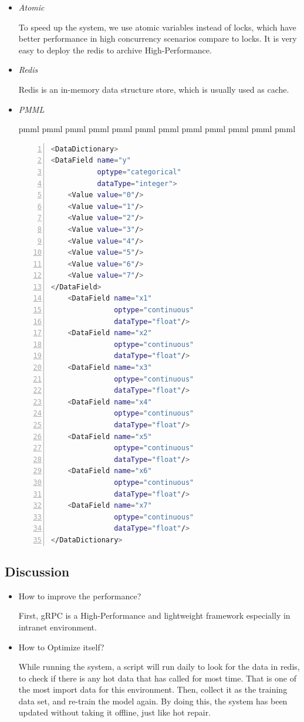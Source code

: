 \documentclass[conference]{IEEEtran}
\begin{document}
\begin{itemize}
	\item \emph{Atomic}

	      To speed up the system, we use atomic variables instead of locks, which have better performance in high concurrency scenarios compare to locks.
	      It is very easy to deploy the redis to archive High-Performance.

	\item \emph{Redis}

	      Redis is an in-memory data structure store, which is usually used as cache.

	\item \emph{PMML}

	pmml pmml pmml pmml pmml pmml pmml pmml pmml pmml pmml pmml
	      \begin{lstlisting}[language={bash},
		basicstyle=\small\menlo,
        numbers=left]
			<DataDictionary>
<DataField name="y" 
		   optype="categorical"
		   dataType="integer">
	<Value value="0"/>
	<Value value="1"/>
	<Value value="2"/>
	<Value value="3"/>
	<Value value="4"/>
	<Value value="5"/>
	<Value value="6"/>
	<Value value="7"/>
</DataField>
	<DataField name="x1"
               optype="continuous" 
               dataType="float"/>
	<DataField name="x2"
               optype="continuous" 
               dataType="float"/>
	<DataField name="x3"
               optype="continuous" 
               dataType="float"/>
	<DataField name="x4"
               optype="continuous" 
               dataType="float"/>
	<DataField name="x5"
               optype="continuous" 
               dataType="float"/>
	<DataField name="x6"
               optype="continuous" 
               dataType="float"/>
	<DataField name="x7"
               optype="continuous" 
               dataType="float"/>
</DataDictionary>
		  \end{lstlisting}


\end{itemize}

\subsection{Discussion}
\begin{itemize}
	\item How to improve the performance?

	      First, gRPC is a High-Performance and lightweight framework especially in intranet environment.

	\item How to Optimize itself?

	      While running the system, a script will run daily to look for the data in redis, to check if there is any hot data that has called for most time.
	      That is one of the most import data for this environment. Then, collect it as the training data set, and re-train the model again.
	      By doing this, the system has been updated without taking it offline, just like hot repair.

\end{itemize}
\end{document}
